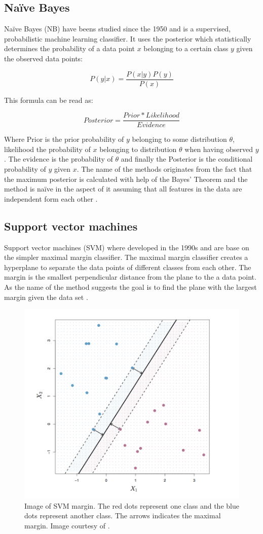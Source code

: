 \subsection{Naïve Bayes}

Naïve Bayes (NB) have beens studied since the 1950 and is a supervised, probabilistic machine learning classifier. It uses the  posterior which statistically determines the probability of a data point $x$ belonging to a certain class $y$ given the observed data points:

\[
P(y|x) = \frac{P(x|y)P(y)}{P(x)}
\]

This formula can be read as:

\[
Posterior = \frac{Prior * Likelihood}{Evidence}
\]

Where Prior is the prior probability of $y$ belonging to some distribution $\theta$, likelihood the probability of $x$ belonging to distribution $\theta$ when having observed $y$. The evidence is the probability of $\theta$ and finally the Posterior is the conditional probability of $y$ given $x$. The name of the methods originates from the fact that the maximum posterior is calculated with help of the Bayes' Theorem and the method is naïve in the aspect of it assuming that all features in the data are independent form each other \parencite{george2012}.


\subsection{Support vector machines}

Support vector machines (SVM) where developed in the 1990s and are base on the simpler maximal margin classifier. The maximal margin classifier creates a hyperplane to separate the data points of different classes from each other. The margin is the smallest perpendicular distance from the plane to the a data point. As the name of the method suggests the goal is to find the plane with the largest margin given the data set \textcite{James:2014}.

\begin{figure}[ht!]
  \centering
  \includegraphics[width=0.7\linewidth]{images/Margin_SVM.png}
  \caption[]
  {\small Image of SVM margin. The red dots represent one class and the blue dots represent another class. The arrows indicates the maximal margin. Image courtesy of \textcite{James:2014}.}
  \label{fig:SVM_Margin}
\end{figure}

